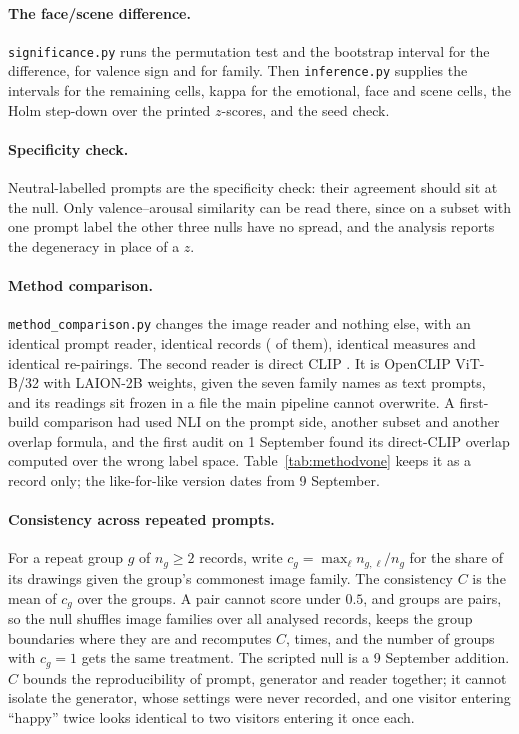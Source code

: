 \paragraph{The face/scene difference.} \texttt{significance.py} runs the permutation test and the bootstrap interval for the difference, for valence sign and for family. Then \texttt{inference.py} supplies the intervals for the remaining cells, kappa for the emotional, face and scene cells, the Holm step-down over the printed $z$-scores, and the seed check.

\paragraph{Specificity check.} Neutral-labelled prompts are the specificity check: their agreement should sit at the null. Only valence--arousal similarity can be read there, since on a subset with one prompt label the other three nulls have no spread, and the analysis reports the degeneracy in place of a $z$.

\paragraph{Method comparison.} \texttt{method\_comparison.py} changes the image reader and nothing else, with an identical prompt reader, identical records (\McN{} of them), identical measures and identical re-pairings. The second reader is direct CLIP \cite{radford2021learning, ilharco2021openclip}. It is OpenCLIP ViT-B/32 with LAION-2B weights, given the seven family names as text prompts, and its readings sit frozen in a file the main pipeline cannot overwrite. A first-build comparison had used NLI on the prompt side, another subset and another overlap formula, and the first audit on 1 September found its direct-CLIP overlap computed over the wrong label space. Table~\ref{tab:methodvone} keeps it as a record only; the like-for-like version dates from 9 September.

\paragraph{Consistency across repeated prompts.} For a repeat group $g$ of $n_g \ge 2$ records, write $c_g = \max_{\ell} n_{g,\ell} / n_g$ for the share of its drawings given the group's commonest image family. The consistency $C$ is the mean of $c_g$ over the \nGroups{} groups. A pair cannot score under $0.5$, and \nPairGroups{} groups are pairs, so the null shuffles image families over all \nAnalysed{} analysed records, keeps the group boundaries where they are and recomputes $C$, \ConsDraws{} times, and the number of groups with $c_g = 1$ gets the same treatment. The scripted null is a 9 September addition. $C$ bounds the reproducibility of prompt, generator and reader together; it cannot isolate the generator, whose settings were never recorded, and one visitor entering ``happy'' twice looks identical to two visitors entering it once each.

